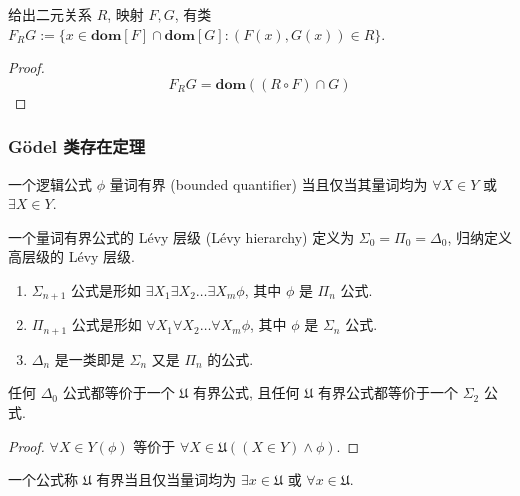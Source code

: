 \begin{lemma}
    \label {definition:NBG class of FRG}
    给出二元关系 \(R\), 映射 \(F, G\), 有类 \(F_R G := \{x \in \mathbf{dom}[F] \cap \mathbf{dom}[G] : (F(x),G(x)) \in R\}\).

    \begin{proof}
        \[
            F_R G = \mathbf{dom} ((R \circ F) \cap G)
        \]
    \end{proof}
\end{lemma}

\subsubsection{Gödel 类存在定理}

\begin{definition}[Lévy 层级]
    \label {definition:Lévy hierarchy}
    一个逻辑公式 \(\phi\) 量词有界 (bounded quantifier) 当且仅当其量词均为 \(\forall X \in Y\) 或 \(\exists X \in Y\).

    一个量词有界公式的 Lévy 层级 (Lévy hierarchy) 定义为 \(\Sigma_0 = \Pi_0 = \Delta_0\), 归纳定义高层级的 Lévy 层级.

    \begin{enumerate}
        \item \(\Sigma_{n + 1}\) 公式是形如 \(\exists X_1 \exists X_2 \dots \exists X_m \phi\), 其中 \(\phi\) 是 \(\Pi_n\) 公式.
        \item \(\Pi_{n + 1}\) 公式是形如 \(\forall X_1 \forall X_2 \dots \forall X_m \phi\), 其中 \(\phi\) 是 \(\Sigma_n\) 公式.
        \item \(\Delta_{n}\) 是一类即是 \(\Sigma_n\) 又是 \(\Pi_n\) 的公式.
    \end{enumerate}
\end{definition}

\begin{example}
    任何 \(\Delta_0\) 公式都等价于一个 \(\mathfrak{U}\) 有界公式, 且任何 \(\mathfrak{U}\) 有界公式都等价于一个 \(\Sigma_2\) 公式.

    \begin{proof}
        \(\forall X \in Y (\phi)\) 等价于 \(\forall X \in \mathfrak{U} ((X \in Y) \land \phi)\).
    \end{proof}
\end{example}

\begin{definition}
    一个公式称 \(\mathfrak{U}\) 有界当且仅当量词均为 \(\exists x \in \mathfrak{U}\) 或 \(\forall x \in \mathfrak{U}\).
\end{definition}

